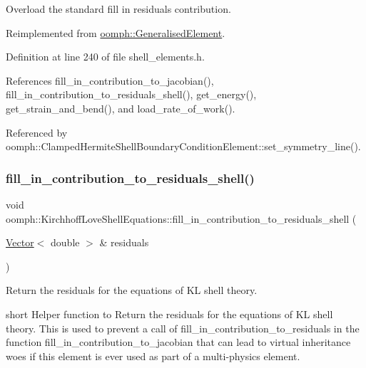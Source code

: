 Overload the standard fill in residuals contribution. 



Reimplemented from \hyperlink{classoomph_1_1GeneralisedElement_a310c97f515e8504a48179c0e72c550d7}{oomph\+::\+Generalised\+Element}.



Definition at line 240 of file shell\+\_\+elements.\+h.



References fill\+\_\+in\+\_\+contribution\+\_\+to\+\_\+jacobian(), fill\+\_\+in\+\_\+contribution\+\_\+to\+\_\+residuals\+\_\+shell(), get\+\_\+energy(), get\+\_\+strain\+\_\+and\+\_\+bend(), and load\+\_\+rate\+\_\+of\+\_\+work().



Referenced by oomph\+::\+Clamped\+Hermite\+Shell\+Boundary\+Condition\+Element\+::set\+\_\+symmetry\+\_\+line().

\mbox{\label{classoomph_1_1KirchhoffLoveShellEquations_a083c16732460cb430553239b9eaa1325}} 
\subsubsection{\texorpdfstring{fill\+\_\+in\+\_\+contribution\+\_\+to\+\_\+residuals\+\_\+shell()}{fill\_in\_contribution\_to\_residuals\_shell()}}
{\footnotesize\ttfamily void oomph\+::\+Kirchhoff\+Love\+Shell\+Equations\+::fill\+\_\+in\+\_\+contribution\+\_\+to\+\_\+residuals\+\_\+shell (\begin{DoxyParamCaption}\item[{\hyperlink{classoomph_1_1Vector}{Vector}$<$ double $>$ \&}]{residuals }\end{DoxyParamCaption})\hspace{0.3cm}{\ttfamily [protected]}}



Return the residuals for the equations of KL shell theory. 

short Helper function to Return the residuals for the equations of KL shell theory. This is used to prevent a call of fill\+\_\+in\+\_\+contribution\+\_\+to\+\_\+residuals in the function fill\+\_\+in\+\_\+contribution\+\_\+to\+\_\+jacobian that can lead to virtual inheritance woes if this element is ever used as part of a multi-\/physics element. 

